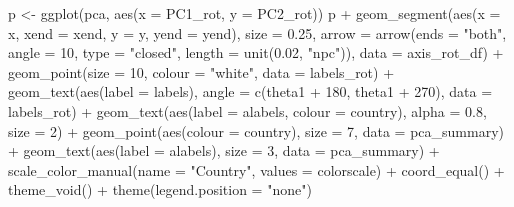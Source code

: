 \documentclass[
]{article}
\newenvironment{Shaded}{\begin{snugshade}}{\end{snugshade}}
\newcommand{\AttributeTok}[1]{\textcolor[rgb]{0.77,0.63,0.00}{#1}}
\newcommand{\DecValTok}[1]{\textcolor[rgb]{0.00,0.00,0.81}{#1}}
\newcommand{\FloatTok}[1]{\textcolor[rgb]{0.00,0.00,0.81}{#1}}
\newcommand{\FunctionTok}[1]{\textcolor[rgb]{0.00,0.00,0.00}{#1}}
\newcommand{\NormalTok}[1]{#1}
\newcommand{\OtherTok}[1]{\textcolor[rgb]{0.56,0.35,0.01}{#1}}
\newcommand{\SpecialCharTok}[1]{\textcolor[rgb]{0.00,0.00,0.00}{#1}}
\newcommand{\StringTok}[1]{\textcolor[rgb]{0.31,0.60,0.02}{#1}}
\begin{document}
\begin{Shaded}
\begin{Highlighting}[]
\NormalTok{p }\OtherTok{\textless{}{-}} \FunctionTok{ggplot}\NormalTok{(pca, }\FunctionTok{aes}\NormalTok{(}\AttributeTok{x =}\NormalTok{ PC1\_rot, }\AttributeTok{y =}\NormalTok{ PC2\_rot))}
\NormalTok{p }\SpecialCharTok{+}
    \FunctionTok{geom\_segment}\NormalTok{(}\FunctionTok{aes}\NormalTok{(}\AttributeTok{x =}\NormalTok{ x, }\AttributeTok{xend =}\NormalTok{ xend, }\AttributeTok{y =}\NormalTok{ y, }\AttributeTok{yend =}\NormalTok{ yend), }\AttributeTok{size =} \FloatTok{0.25}\NormalTok{, }\AttributeTok{arrow =} \FunctionTok{arrow}\NormalTok{(}\AttributeTok{ends =} \StringTok{"both"}\NormalTok{, }\AttributeTok{angle =} \DecValTok{10}\NormalTok{, }\AttributeTok{type =} \StringTok{"closed"}\NormalTok{, }\AttributeTok{length =} \FunctionTok{unit}\NormalTok{(}\FloatTok{0.02}\NormalTok{, }\StringTok{"npc"}\NormalTok{)), }\AttributeTok{data =}\NormalTok{ axis\_rot\_df) }\SpecialCharTok{+}
    \FunctionTok{geom\_point}\NormalTok{(}\AttributeTok{size =} \DecValTok{10}\NormalTok{, }\AttributeTok{colour =} \StringTok{"white"}\NormalTok{, }\AttributeTok{data =}\NormalTok{ labels\_rot) }\SpecialCharTok{+}
    \FunctionTok{geom\_text}\NormalTok{(}\FunctionTok{aes}\NormalTok{(}\AttributeTok{label =}\NormalTok{ labels), }\AttributeTok{angle =} \FunctionTok{c}\NormalTok{(theta1 }\SpecialCharTok{+} \DecValTok{180}\NormalTok{, theta1 }\SpecialCharTok{+} \DecValTok{270}\NormalTok{), }\AttributeTok{data =}\NormalTok{ labels\_rot) }\SpecialCharTok{+}
    \FunctionTok{geom\_text}\NormalTok{(}\FunctionTok{aes}\NormalTok{(}\AttributeTok{label =}\NormalTok{ alabels, }\AttributeTok{colour =}\NormalTok{ country), }\AttributeTok{alpha =} \FloatTok{0.8}\NormalTok{, }\AttributeTok{size =} \DecValTok{2}\NormalTok{) }\SpecialCharTok{+}
    \FunctionTok{geom\_point}\NormalTok{(}\FunctionTok{aes}\NormalTok{(}\AttributeTok{colour =}\NormalTok{ country), }\AttributeTok{size =} \DecValTok{7}\NormalTok{, }\AttributeTok{data =}\NormalTok{ pca\_summary) }\SpecialCharTok{+}
    \FunctionTok{geom\_text}\NormalTok{(}\FunctionTok{aes}\NormalTok{(}\AttributeTok{label =}\NormalTok{ alabels), }\AttributeTok{size =} \DecValTok{3}\NormalTok{, }\AttributeTok{data =}\NormalTok{ pca\_summary) }\SpecialCharTok{+}
    \FunctionTok{scale\_color\_manual}\NormalTok{(}\AttributeTok{name =} \StringTok{"Country"}\NormalTok{, }\AttributeTok{values =}\NormalTok{ colorscale) }\SpecialCharTok{+}
    \FunctionTok{coord\_equal}\NormalTok{() }\SpecialCharTok{+}
    \FunctionTok{theme\_void}\NormalTok{() }\SpecialCharTok{+}
    \FunctionTok{theme}\NormalTok{(}\AttributeTok{legend.position =} \StringTok{"none"}\NormalTok{)}
\end{Highlighting}
\end{Shaded}
\end{document}
